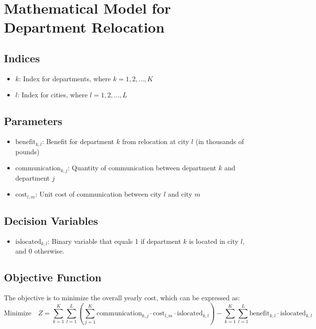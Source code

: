 \documentclass{article}
\begin{document}
\section*{Mathematical Model for Department Relocation}

\subsection*{Indices}
\begin{itemize}
    \item \( k \): Index for departments, where \( k = 1, 2, \ldots, K \)
    \item \( l \): Index for cities, where \( l = 1, 2, \ldots, L \)
\end{itemize}

\subsection*{Parameters}
\begin{itemize}
    \item \( \text{benefit}_{k, l} \): Benefit for department \( k \) from relocation at city \( l \) (in thousands of pounds)
    \item \( \text{communication}_{k, j} \): Quantity of communication between department \( k \) and department \( j \)
    \item \( \text{cost}_{l, m} \): Unit cost of communication between city \( l \) and city \( m \)
\end{itemize}

\subsection*{Decision Variables}
\begin{itemize}
    \item \( \text{islocated}_{k, l} \): Binary variable that equals 1 if department \( k \) is located in city \( l \), and 0 otherwise.
\end{itemize}

\subsection*{Objective Function}
The objective is to minimize the overall yearly cost, which can be expressed as:
\[
\text{Minimize} \quad Z = \sum_{k=1}^K \sum_{l=1}^L \left( \sum_{j=1}^K \text{communication}_{k, j} \cdot \text{cost}_{l, m} \cdot \text{islocated}_{k, l} \right) - \sum_{k=1}^K \sum_{l=1}^L \text{benefit}_{k, l} \cdot \text{islocated}_{k, l}
\]
\end{document}

